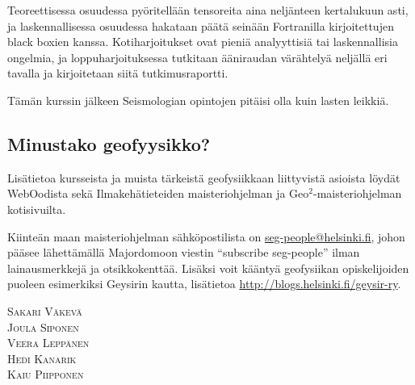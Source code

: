 \documentclass[../ala_hataile.tex]{subfiles}
\begin{document}
Teoreettisessa osuudessa pyöritellään tensoreita aina neljänteen kerta\-lukuun asti, ja laskennallisessa osuudessa hakataan päätä seinään Fortranilla kirjoitettujen black boxien kanssa. Kotiharjoitukset ovat pieniä analyyttisiä tai laskennallisia ongelmia, ja loppu\-harjoituksessa tutkitaan ääni\-raudan värähtelyä neljällä eri tavalla ja kirjoitetaan siitä tutkimus\-raportti. 

Tämän kurssin jälkeen Seismologian opintojen pitäisi olla kuin lasten leikkiä.

\subsection*{Minustako geofyysikko?}
Lisätietoa kursseista ja muista tärkeistä
geofysiikkaan liittyvistä asioista löydät
WebOodista sekä Ilmakehätieteiden maisteriohjelman ja Geo$^2$-maisteri\-ohjelman kotisivuilta.

Kiinteän maan maisteriohjelman sähköpostilista
on \url{seg-people@helsinki.fi}, johon
pääsee lähettämällä Majordomoon viestin
``subscribe seg-people'' ilman lainausmerkkejä
ja otsikkokenttää. Lisäksi voit kääntyä
geofysiikan opiskelijoiden puoleen esimerkiksi
Geysirin kautta, lisätietoa \url{http://blogs.helsinki.fi/geysir-ry}.

\vspace{0.5cm}
\noindent
\textsc{Sakari Väkevä}\\
\textsc{Joula Siponen}\\
\textsc{Veera Leppänen}\\
\textsc{Hedi Kanarik}\\
\textsc{Kaiu Piipponen}
\end{document}
